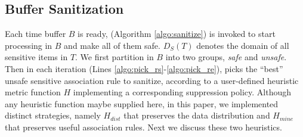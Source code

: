 \subsection{Buffer Sanitization}
\label{sec:sanitize}
Each time \qid buffer $B$ is ready, \SanitizeBuffer
(Algorithm \ref{algo:sanitize}) is invoked to start processing \qids in $B$
and make all of them safe. $D_S(T)$ denotes the domain of all sensitive
items in $T$.
We first partition \qids in $B$ into two groups, {\em safe} and {\em unsafe}.
Then in each iteration (Lines \ref{algo:pick_rs}-\ref{algo:pick_re}),
\SanitizeBuffer
 picks the ``best'' unsafe sensitive association rule
to sanitize, according to a user-defined heuristic metric function $H$
implementing a corresponding suppression policy.
Although any heuristic function maybe supplied here, in this paper,
we implemented distinct strategies, namely
$H_{dist}$ that preserves the data distribution and $H_{mine}$ that preserves
useful association rules. Next we discuss these two heuristics.


